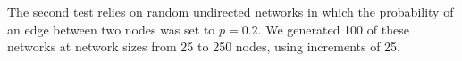 The second test relies on random undirected networks in which the probability of an edge %
between two nodes was set to $p = 0.2$.
We generated 100 of these networks at network sizes from 25 to 250 nodes, using increments of 25. %






